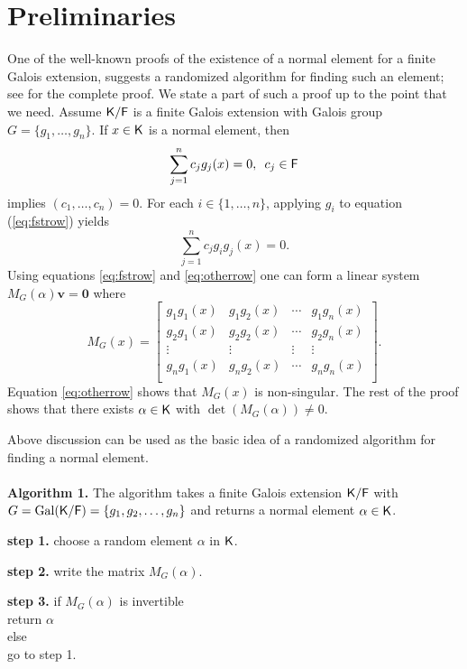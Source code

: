 \section{Preliminaries}
\label{sec:pre}

One of the well-known proofs of the existence of a normal element for a
finite Galois extension, suggests a randomized algorithm for finding such
an element; see \cite[Theorem 6.13.1]{Lang} for the complete proof.  We
state a part of such a proof up to the point that we need. Assume ${\mathsf{K}}/{\mathsf{F}}$ is
a finite Galois extension with Galois group
$G = \lbrace g_1 , \ldots , g_n \rbrace$. If $x \in {\mathsf{K}}$ is a normal element,
then
 \begin{equation}\label{eq:fstrow}
 \sum_{j=1}^n 
 c_j g_j(x)=0, \,\,\, c_j \in {\mathsf{F}} 
 \end{equation} 
 implies $(c_1, \ldots ,c_n) = 0$. For each $i \in \lbrace 1, \ldots , n\rbrace$, applying $g_i$ to equation (\ref{eq:fstrow}) yields
\begin{equation} \label{eq:otherrow}
 \sum_{j=1}^n 
 c_j g_i g_j(x)=0.
 \end{equation}
 Using equations \ref{eq:fstrow} and \ref{eq:otherrow} one can form a linear system $M_G(\alpha)\textbf{v} = \textbf{0}$ where 
 $$ M_G(x) =
\begin{bmatrix}
g_1 g_1(x) & g_1 g_2(x) & \cdots & g_1 g_n(x) \\
g_2 g_1(x) & g_2 g_2(x) & \cdots & g_2 g_n(x) \\
\vdots		& \vdots	& \vdots & \vdots \\
g_n g_1(x) & g_n g_2(x) & \cdots & g_n g_n(x) \\
\end{bmatrix}. 
 $$
 Equation \ref{eq:otherrow} shows that $M_G(x)$ is non-singular. The rest of the proof shows that there exists $\alpha \in {\mathsf{K}}$ with $\det(M_G(\alpha))\neq 0$.
 
 
 Above discussion can be used as the basic idea of a randomized algorithm for finding a
 normal element.\\
 \\
 \textbf{Algorithm 1.} \label{alg:naive}
 The algorithm takes a finite Galois extension ${\mathsf{K}}/{\mathsf{F}}$ with 
 $G =  \mathrm{Gal}({\mathsf{K}}/{\mathsf{F}}) = \lbrace g_1, g_2, \ldots , g_n \rbrace$ and returns a normal
 element $\alpha \in {\mathsf{K}}$.
 \begin{description}
 \item \textbf{step 1.} choose a random element $\alpha$ in ${\mathsf{K}}$.
 \item \textbf{step 2.} write the matrix $M_G(\alpha)$.
 \item \textbf{step 3.} if $ M_G(\alpha)$ is invertible\\
 \hspace{10cm} return $\alpha$\\
 \hspace{2cm} else \\
 \hspace{5cm} go to step 1.\\  
 \end{description}
 
